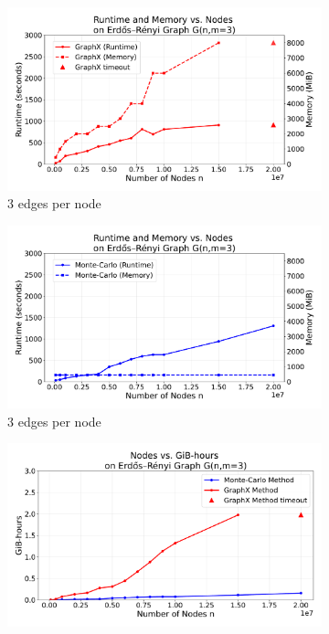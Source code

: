 


\begin{figure}[H]
    \centering
    \begin{subfigure}[t]{0.75\linewidth}
        \centering
        \includegraphics[width=\linewidth]{images/plots/ER_3edg/combined_runtime_memory_vs_nodes_3edges_gx.pdf}
        \caption{3 edges per node}
        \label{fig:3run}
    \end{subfigure}
    \begin{subfigure}[t]{0.75\linewidth}
        \centering
        \includegraphics[width=\linewidth]{images/plots/ER_3edg/combined_runtime_memory_vs_nodes_3edges_mc.pdf}
        \caption{3 edges per node}
        \label{fig:3cost}
    \end{subfigure}
    \begin{subfigure}[t]{0.75\linewidth}
        \centering
        \includegraphics[width=\linewidth]{images/plots/ER_3edg/gbhrs_nodes_er_graph_3edges.pdf}

\end{subfigure}
\end{figure}
